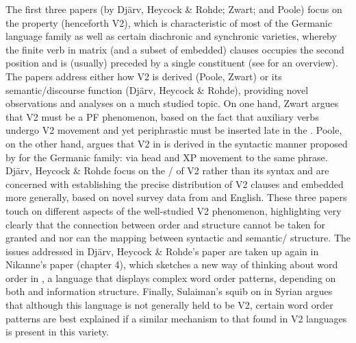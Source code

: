 \documentclass[output=paper]{langsci/langscibook}
\begin{document}
The first three papers (by Djärv, Heycock \& Rohde; Zwart; and Poole) focus on the  property (henceforth V2), which is characteristic of most of the Germanic language family as well as certain diachronic and synchronic  varieties, where\-by the finite verb in matrix (and a subset of embedded) clauses occupies the second position and is (usually) preceded by a single constituent (see \citealt{Holmberg2015verbsecond} for an overview). The papers address either how V2 is derived (Poole, Zwart) or its semantic/discourse function (Djärv, Heycock \& Rohde), providing novel observations and analyses on a much studied topic. On one hand, Zwart argues that V2 must be a PF phenomenon, based on the fact that auxiliary verbs undergo V2 movement and yet periphrastic  must be inserted late in the . Poole, on the other hand, argues that V2 in  is derived in the syntactic manner proposed by \citet{Holmberg2014verbsecond} for the Germanic family: via head and XP movement to the same phrase. Djärv, Heycock \& Rohde focus on the \slash {} of V2 rather than its syntax and are concerned with establishing the precise distribution of V2 clauses and embedded  more generally, based on novel survey data from  and English. These three papers touch on different aspects of the well-studied V2 phenomenon, highlighting very clearly that the connection between order and structure cannot be taken for granted and nor can the mapping between syntactic and semantic/ structure. The issues addressed in Djärv, Heycock \& Rohde’s paper are taken up again in Nikanne’s paper (chapter 4), which sketches a new way of thinking about word order in , a language that displays complex word order patterns, depending on both  and information structure. Finally, Sulaiman’s squib on  in Syrian  argues that although this language is not generally held to be V2, certain word order patterns are best explained if a similar mechanism to that found in V2 languages is present in this  variety. 
\end{document}
